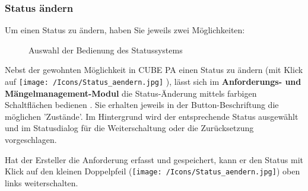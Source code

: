 \subsubsection{Status ändern}

Um einen Status zu ändern, haben Sie jeweils zwei Möglichkeiten:

\begin{figure}[H]
\caption{Auswahl der Bedienung des Statussystems}
\end{figure}

Nebst der gewohnten Möglichkeit in CUBE PA einen Status zu ändern (mit Klick auf \texttt{[image: /Icons/Status\_aendern.jpg]} ), lässt sich im \textbf{Anforderungs- und Mängelmanagement-Modul} die Status-Änderung mittels farbigen Schaltflächen bedienen . Sie erhalten jeweils in der Button-Beschriftung die möglichen 'Zustände'. Im Hintergrund wird der entsprechende Status ausgewählt und im Statusdialog für die Weiterschaltung oder die Zurücksetzung vorgeschlagen.

\vspace{\baselineskip}

Hat der Ersteller die Anforderung erfasst und gespeichert, kann er den Status mit Klick auf den kleinen Doppelpfeil (\texttt{[image: /Icons/Status\_aendern.jpg]}) oben links weiterschalten.

\pagebreak 

